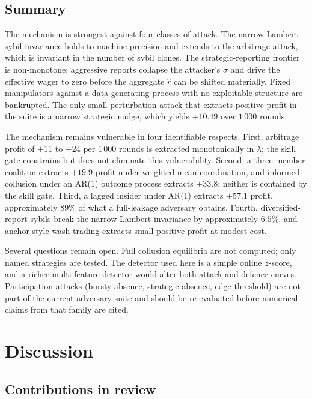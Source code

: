 \documentclass[
  11pt,
  a4paper,
  oneside]{report}
\begin{document}
\section{Summary}\label{summary}

The mechanism is strongest against four classes of attack. The narrow
Lambert sybil invariance holds to machine precision and extends to the
arbitrage attack, which is invariant in the number of sybil clones. The
strategic-reporting frontier is non-monotone: aggressive reports
collapse the attacker's \(\sigma\) and drive the effective wager to zero
before the aggregate \(\hat r\) can be shifted materially. Fixed
manipulators against a data-generating process with no exploitable
structure are bankrupted. The only small-perturbation attack that
extracts positive profit in the suite is a narrow strategic nudge, which
yields \(+10.49\) over \(1\,000\) rounds.

The mechanism remains vulnerable in four identifiable respects. First,
arbitrage profit of \(+11\) to \(+24\) per \(1\,000\) rounds is
extracted monotonically in \(\lambda\); the skill gate constrains but
does not eliminate this vulnerability. Second, a three-member coalition
extracts \(+19.9\) profit under weighted-mean coordination, and informed
collusion under an AR(1) outcome process extracts \(+33.8\); neither is
contained by the skill gate. Third, a lagged insider under AR(1)
extracts \(+57.1\) profit, approximately \(89\%\) of what a full-leakage
adversary obtains. Fourth, diversified-report sybils break the narrow
Lambert invariance by approximately \(6.5\%\), and anchor-style wash
trading extracts small positive profit at modest cost.

Several questions remain open. Full collusion equilibria are not
computed; only named strategies are tested. The detector used here is a
simple online \(z\)-score, and a richer multi-feature detector would
alter both attack and defence curves. Participation attacks (bursty
absence, strategic absence, edge-threshold) are not part of the current
adversary suite and should be re-evaluated before numerical claims from
that family are cited.

\chapter{Discussion}\label{ch:discussion}

\section{Contributions in review}\label{contributions-in-review}
\end{document}

